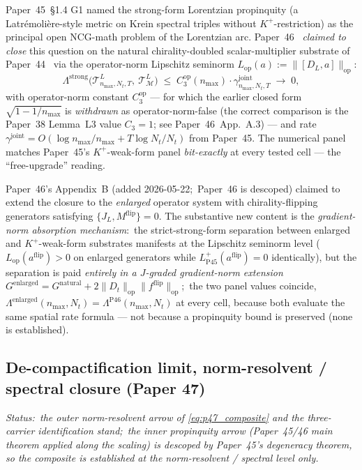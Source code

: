 \documentclass[11pt,a4paper]{article}
\theoremstyle{plain}
\theoremstyle{definition}
\newcommand{\nmax}{n_{\max}}
\newcommand{\Nt}{N_{t}}
\newcommand{\DL}{D_{L}}
\newcommand{\JL}{J_{L}}
\newcommand{\Tcal}{\mathcal{T}}
\newcommand{\Manifold}{\mathcal{M}}
\newcommand{\opnorm}[1]{\lVert #1 \rVert_{\mathrm{op}}}
\newcommand{\gammajoint}{\gamma^{\mathrm{joint}}}
\begin{document}
Paper~45~\S 1.4 G1 named the strong-form Lorentzian propinquity (a
Latr\'emoli\`ere-style metric on Krein spectral triples without
$K^{+}$-restriction) as the principal open NCG-math problem of the
Lorentzian arc.  Paper~46~\cite{paper46} \emph{claimed to close} this
question on the natural chirality-doubled scalar-multiplier substrate
of Paper~44~\cite{paper44} via the operator-norm Lipschitz seminorm
$L_{\mathrm{op}}(a) := \opnorm{[\DL, a]}$:
\begin{equation}\label{eq:p46_main}
\Lambda^{\mathrm{strong}}\bigl(\Tcal^{L}_{\nmax, \Nt, T},\
\Tcal^{L}_{\Manifold}\bigr)
\;\le\; C_{3}^{\mathrm{op}}(\nmax) \cdot \gammajoint_{\nmax, \Nt, T}
\;\to\; 0,
\end{equation}
with operator-norm constant $C_{3}^{\mathrm{op}}$ --- for which the
earlier closed form $\sqrt{1 - 1/\nmax}$ is \emph{withdrawn} as
operator-norm-false (the correct comparison is the Paper~38 Lemma~L3
value $C_{3} = 1$; see Paper~46~App.~A.3) --- and rate
$\gammajoint = O(\log\nmax/\nmax + T\log\Nt/\Nt)$ from Paper~45.  The numerical panel matches
Paper~45's $K^{+}$-weak-form panel \emph{bit-exactly} at every
tested cell --- the ``free-upgrade'' reading.

Paper~46's Appendix~B (added 2026-05-22;\ Paper~46 is descoped) claimed to
extend the closure to the
\emph{enlarged} operator system with chirality-flipping generators
satisfying $\{\JL, M^{\mathrm{flip}}\} = 0$.  The substantive new
content is the \emph{gradient-norm absorption mechanism}:\ the
strict-strong-form separation between enlarged and $K^{+}$-weak-form
substrates manifests at the Lipschitz seminorm level
($L_{\mathrm{op}}(a^{\mathrm{flip}}) > 0$ on enlarged generators while
$L^{+}_{\mathrm{P45}}(a^{\mathrm{flip}}) = 0$ identically), but the
separation is paid \emph{entirely in a $J$-graded gradient-norm
extension} $G^{\mathrm{enlarged}} = G^{\mathrm{natural}} + 2\opnorm{D_{t}}
\opnorm{f^{\mathrm{flip}}}$;\ the two panel values coincide,
$\Lambda^{\mathrm{enlarged}}(\nmax, \Nt) = \Lambda^{\mathrm{P46}}(\nmax, \Nt)$
at every cell, because both evaluate the same spatial rate formula ---
not because a propinquity bound is preserved (none is established).

\subsection{De-compactification limit, norm-resolvent / spectral closure (Paper 47)}
\label{sec:closures_paper47}

\emph{Status:\ the \emph{outer} norm-resolvent arrow of
\eqref{eq:p47_composite} and the three-carrier identification stand;\
the \emph{inner} propinquity arrow
(Paper~45/46 main theorem applied along the scaling) is descoped by
Paper~45's degeneracy theorem, so
the composite is established at the norm-resolvent / spectral level
only.}
\end{document}
